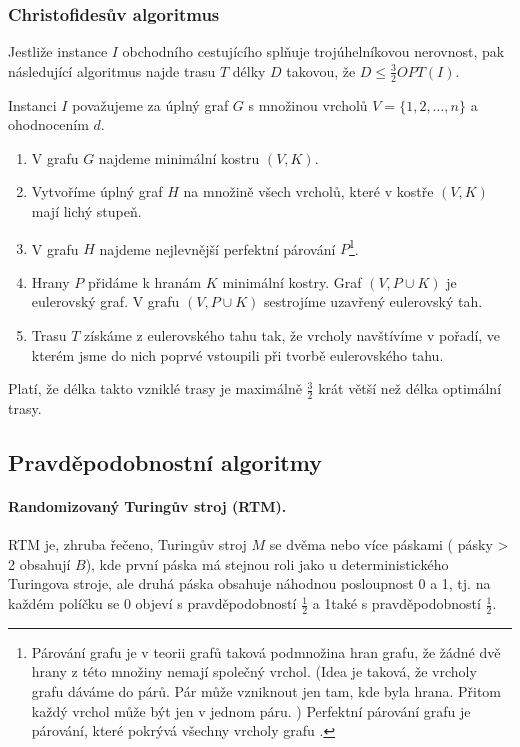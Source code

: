 \subsubsection*{Christofidesův algoritmus}
Jestliže instance $I$ obchodního cestujícího splňuje trojúhelníkovou nerovnost, pak následující algoritmus najde trasu $T$ délky $D$ takovou, že $D \leq \frac{3}{2} OPT(I)$.

Instanci $I$ považujeme za úplný graf $G$ s množinou vrcholů $V = \{1, 2, \hdots , n\}$ a ohodnocením $d$.

\begin{enumerate}[itemsep=0pt]
    \item V grafu $G$ najdeme minimální kostru $(V,K)$.
    \item Vytvoříme úplný graf $H$ na množině všech vrcholů, které v kostře $(V,K)$ mají lichý stupeň.
    \item V grafu $H$ najdeme nejlevnější perfektní párování $P$\footnote{Párování grafu je v teorii grafů taková podmnožina hran grafu, že žádné dvě hrany z této množiny nemají společný vrchol. (Idea je taková, že vrcholy grafu dáváme do párů. Pár může vzniknout jen tam, kde byla hrana. Přitom každý vrchol může být jen v jednom páru. ) Perfektní párování grafu je párování, které pokrývá všechny vrcholy grafu \cite{wiki:parovani}.}.
    \item Hrany $P$ přidáme k hranám $K$ minimální kostry. Graf $(V,P \cup K)$ je eulerovský graf. V grafu $(V, P \cup K)$ sestrojíme uzavřený eulerovský tah.
    \item Trasu $T$ získáme z eulerovského tahu tak, že vrcholy navštívíme v pořadí, ve kterém jsme do nich poprvé vstoupili při tvorbě eulerovského tahu.
\end{enumerate}

\noindent Platí, že délka takto vzniklé trasy je maximálně $\frac{3}{2}$ krát větší než délka optimální trasy.

\subsection*{Pravděpodobnostní algoritmy}

\paragraph{Randomizovaný Turingův stroj (RTM).} RTM je, zhruba řečeno, Turingův stroj $M$ se dvěma nebo více páskami ( pásky > 2 obsahují $B$), kde první páska má stejnou roli jako u deterministického Turingova stroje, ale druhá páska obsahuje náhodnou posloupnost 0 a 1, tj. na každém políčku se 0 objeví s pravděpodobností $\frac{1}{2}$ a 1také s pravděpodobností $\frac{1}{2}$.

